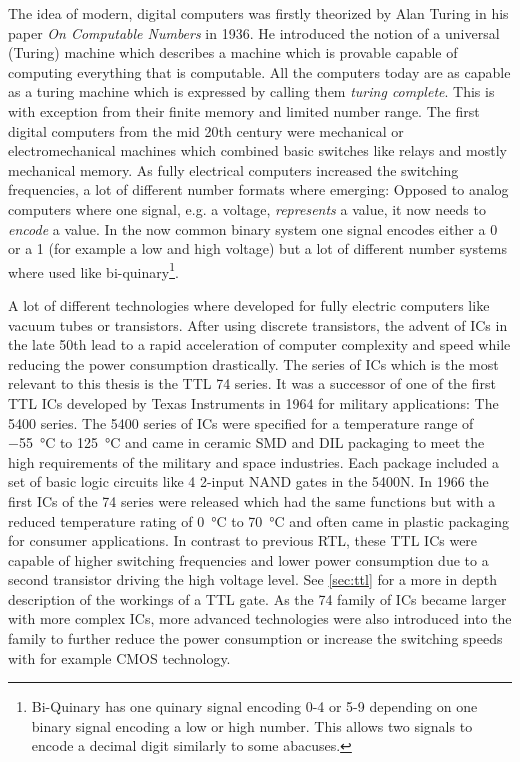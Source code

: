 The idea of modern, digital computers was firstly theorized by Alan Turing in his paper \emph{On Computable Numbers} in 1936. \cite{10.1112/plms/s2-42.1.230}
He introduced the notion of a universal (Turing) machine which describes a machine which is provable capable of computing everything that is computable.
All the computers today are as capable as a turing machine which is expressed by calling them \emph{turing complete}.
This is with exception from their finite memory and limited number range.
The first digital computers from the mid 20th century were mechanical or electromechanical machines which combined basic switches like relays and mostly mechanical memory.
As fully electrical computers increased the switching frequencies, a lot of different number formats where emerging:
Opposed to analog computers where one signal, e.g. a voltage, \emph{represents} a value, it now needs to \emph{encode} a value.
In the now common binary system one signal encodes either a 0 or a 1 (for example a low and high voltage) but a lot of different number systems where used like bi-quinary\footnote{Bi-Quinary has one quinary signal encoding 0-4 or 5-9 depending on one binary signal encoding a low or high number. This allows two signals to encode a decimal digit similarly to some abacuses.}.

A lot of different technologies where developed for fully electric computers like vacuum tubes or transistors.
After using discrete transistors, the advent of \glspl{IC} in the late 50th lead to a rapid acceleration of computer complexity and speed while reducing the power consumption drastically.
The series of \glspl{IC} which is the most relevant to this thesis is the \gls{TTL} 74 series.
It was a successor of one of the first \gls{TTL} \glspl{IC} developed by Texas Instruments in 1964 for military applications: The 5400 series. \cite{ICs}
The 5400 series of \glspl{IC} were specified for a temperature range of \qty{-55}{\celsius} to \qty{+125}{\celsius} and came in ceramic \gls{SMD} and \gls{DIL} packaging to meet the high requirements of the military and space industries.
Each package included a set of basic logic circuits like 4 2-input NAND gates in the 5400N.
In 1966 the first \glspl{IC} of the 74 series were released which had the same functions but with a reduced temperature rating of \qty{0}{\celsius} to \qty{+70}{\celsius} and often came in plastic packaging for consumer applications.
In contrast to previous \gls{RTL}, these \gls{TTL} \glspl{IC} were capable of higher switching frequencies and lower power consumption due to a second transistor driving the high voltage level.
See \cref{sec:ttl} for a more in depth description of the workings of a \gls{TTL} gate.
As the 74 family of \glspl{IC} became larger with more complex \glspl{IC}, more advanced technologies were also introduced into the family to further reduce the power consumption or increase the switching speeds with for example \gls{CMOS} technology.

